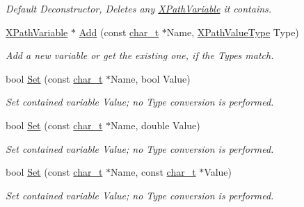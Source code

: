 \begin{DoxyCompactItemize}
\begin{DoxyCompactList}\small\item\em Default Deconstructor, Deletes any \hyperlink{classphys_1_1xml_1_1XPathVariable}{XPathVariable} it contains. \item\end{DoxyCompactList}\item 
\hyperlink{classphys_1_1xml_1_1XPathVariable}{XPathVariable} $\ast$ \hyperlink{classphys_1_1xml_1_1XPathVariableSet_a26c9bb8f7aa3aaedfcdcdca2e1822deb}{Add} (const \hyperlink{namespacephys_1_1xml_afc87705cd1c2917d87b879715a2d8f6e}{char\_\-t} $\ast$Name, \hyperlink{namespacephys_1_1xml_a339b9eef674ba44100110e5524bc575d}{XPathValueType} Type)
\begin{DoxyCompactList}\small\item\em Add a new variable or get the existing one, if the Types match. \item\end{DoxyCompactList}\item 
bool \hyperlink{classphys_1_1xml_1_1XPathVariableSet_a7095efef6fc3978479fb8b6f203c6f4c}{Set} (const \hyperlink{namespacephys_1_1xml_afc87705cd1c2917d87b879715a2d8f6e}{char\_\-t} $\ast$Name, bool Value)
\begin{DoxyCompactList}\small\item\em Set contained variable Value; no Type conversion is performed. \item\end{DoxyCompactList}\item 
bool \hyperlink{classphys_1_1xml_1_1XPathVariableSet_aa713e33048ee463a58b9e6988daab214}{Set} (const \hyperlink{namespacephys_1_1xml_afc87705cd1c2917d87b879715a2d8f6e}{char\_\-t} $\ast$Name, double Value)
\begin{DoxyCompactList}\small\item\em Set contained variable Value; no Type conversion is performed. \item\end{DoxyCompactList}\item 
bool \hyperlink{classphys_1_1xml_1_1XPathVariableSet_afa99a98b5c4e4790a921f67a153a9ff4}{Set} (const \hyperlink{namespacephys_1_1xml_afc87705cd1c2917d87b879715a2d8f6e}{char\_\-t} $\ast$Name, const \hyperlink{namespacephys_1_1xml_afc87705cd1c2917d87b879715a2d8f6e}{char\_\-t} $\ast$Value)
\begin{DoxyCompactList}\small\item\em Set contained variable Value; no Type conversion is performed. \item\end{DoxyCompactList}\item 

\end{DoxyCompactItemize}
